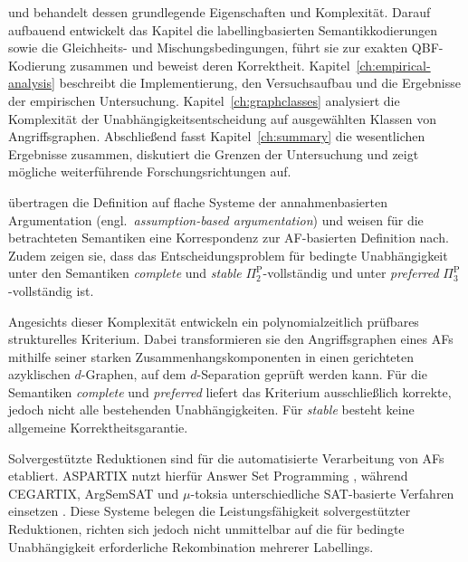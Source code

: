 und behandelt dessen grundlegende Eigenschaften und Komplexität.
Darauf aufbauend entwickelt das Kapitel die labellingbasierten
Semantikkodierungen sowie die Gleichheits- und Mischungsbedingungen,
führt sie zur exakten QBF-Kodierung zusammen und beweist deren
Korrektheit. Kapitel~\ref{ch:empirical-analysis}
beschreibt die Implementierung, den Versuchsaufbau und die Ergebnisse
der empirischen Untersuchung. Kapitel~\ref{ch:graphclasses} analysiert die Komplexität der
Unabhängigkeitsentscheidung auf ausgewählten Klassen von
Angriffsgraphen. Abschließend fasst Kapitel~\ref{ch:summary} die wesentlichen
Ergebnisse zusammen, diskutiert die Grenzen der Untersuchung und zeigt
mögliche weiterführende Forschungsrichtungen auf.






















\iffalse
\citeauthor*{bluemel:2025:independence-aba} 
\cite{bluemel:2025:independence-aba} übertragen die Definition 
auf flache Systeme der annahmenbasierten Argumentation 
(engl.\ \emph{assumption-based argumentation}) und weisen für 
die betrachteten Semantiken eine Korrespondenz zur AF-basierten 
Definition nach. Zudem zeigen sie, dass das Entscheidungsproblem 
für bedingte Unabhängigkeit unter den Semantiken \emph{complete} 
und \emph{stable} \(\Pi_2^{\mathrm{P}}\)-vollständig und 
unter \emph{preferred} \(\Pi_3^{\mathrm{P}}\)-vollständig ist.

Angesichts dieser Komplexität entwickeln \textcite{rienstra:2020:independence-af} 
ein polynomialzeitlich prüfbares strukturelles Kriterium. 
Dabei transformieren sie den Angriffsgraphen eines AFs mithilfe 
seiner starken Zusammenhangskomponenten in einen gerichteten 
azyklischen \(d\)-Graphen, auf dem \(d\)-Separation geprüft werden 
kann. Für die Semantiken \emph{complete} und \emph{preferred} 
liefert das Kriterium ausschließlich korrekte, jedoch nicht 
alle bestehenden Unabhängigkeiten. 
Für \emph{stable} besteht keine allgemeine Korrektheitsgarantie.

Solvergestützte Reduktionen sind für die automatisierte Verarbeitung von
AFs etabliert. ASPARTIX nutzt hierfür Answer Set Programming
\cite{egly:gaggl:woltran:2010:aspartix}, während CEGARTIX, ArgSemSAT und
\(\mu\)-toksia unterschiedliche SAT-basierte Verfahren einsetzen
\cite{dvorak:etal:2014:cegartix,
cerutti:giacomin:vallati:2019:argsemsat,
niskanen:jarvisalo:2020:mu-toksia}. Diese Systeme belegen die
Leistungsfähigkeit solvergestützter Reduktionen, richten sich jedoch 
nicht unmittelbar auf die für bedingte Unabhängigkeit erforderliche 
Rekombination mehrerer Labellings.

